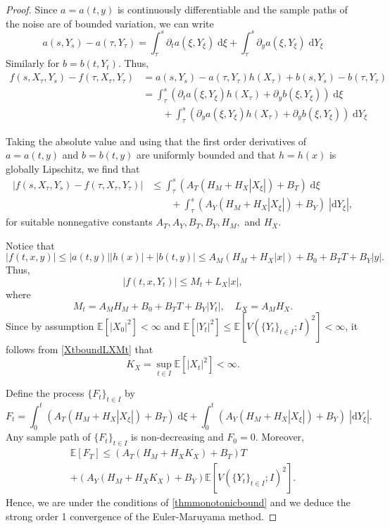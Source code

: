 \documentclass[reqno,12pt]{amsart}
\theoremstyle{plain}%
\theoremstyle{definition}
\begin{document}
\begin{proof}
    Since $a=a(t, y)$ is continuously differentiable and the sample paths of the noise are of bounded variation, we can write
    \[ a(s, Y_s) - a(\tau, Y_\tau) = \int_\tau^s \partial_t a(\xi, Y_\xi) \;\mathrm{d}\xi + \int_\tau^s \partial_y a(\xi, Y_\xi)\;\mathrm{d}Y_\xi
    \]
    Similarly for $b=b(t, Y_t)$. Thus,
    \begin{align*}
        f(s, X_\tau, Y_s) - f(\tau, X_\tau, Y_\tau) & = a(s, Y_s) - a(\tau, Y_\tau)h(X_\tau) + b(s, Y_s) - b(\tau, Y_\tau) \\
        & = \int_\tau^s \left(\partial_t a(\xi, Y_\xi)h(X_\tau) + \partial_y b(\xi, Y_\xi)\right) \;\mathrm{d}\xi \\
        & \qquad + \int_\tau^s \left(\partial_y a(\xi, Y_\xi) h(X_\tau) + \partial_y b(\xi, Y_\xi)\right)\;\mathrm{d}Y_\xi
    \end{align*}

    Taking the absolute value and using that the first order derivatives of $a=a(t, y)$ and $b=b(t, y)$ are uniformly bounded and that $h=h(x)$ is globally Lipschitz, we find that
    \begin{align*}
        |f(s, X_\tau, Y_s) - f(\tau, X_\tau, Y_\tau)| & \leq \int_\tau^s \left(A_T(H_M + H_X|X_\xi|) + B_T\right) \;\mathrm{d}\xi \\
        & \qquad + \int_\tau^s \left(A_Y (H_M + H_X|X_\xi|) + B_Y\right)\;|\mathrm{d}Y_\xi|,
    \end{align*}
    for suitable nonnegative constants $A_T, A_Y, B_T, B_Y, H_M,$ and $H_X$.

    Notice that
    \[
        |f(t, x, y)| \leq |a(t, y)||h(x)| + |b(t, y)| \leq A_M(H_M + H_X|x|) + B_0 + B_T T + B_Y |y|.
    \]
    Thus,
    \[
        |f(t, x, Y_t)| \leq M_t + L_X|x|,
    \]
    where
    \[
        M_t = A_MH_M + B_0 + B_T T + B_Y|Y_t|, \quad L_X = A_MH_X.
    \]
    Since by assumption $\mathbb{E}[|X_0|^2] < \infty$ and $\mathbb{E}[|Y_t|^2] \leq \mathbb{E}[V(\{Y_t\}_{t\in I}; I)^2] < \infty$, it follows from \eqref{XtboundLXMt} that
    \[
        K_X = \sup_{t\in I}\mathbb{E}[|X_t|^2] < \infty.
    \]

    Define the process $\{F_t\}_{t\in I}$ by
    \[
        F_t = \int_0^t \left(A_T(H_M + H_X|X_\xi|) + B_T\right) \;\mathrm{d}\xi + \int_0^t \left(A_Y (H_M + H_X|X_\xi|) + B_Y\right)\;|\mathrm{d}Y_\xi|.
    \]
    Any sample path of $\{F_t\}_{t\in I}$ is non-decreasing and $F_0 = 0$. Moreover,
    \begin{multline*}
        \mathbb{E}[F_T] \leq \left(A_T(H_M + H_XK_X) + B_T\right)T \\
        + \left(A_Y (H_M + H_XK_X) + B_Y\right)\mathbb{E}[V(\{Y_t\}_{t\in I}; I)^2].
    \end{multline*}
    Hence, we are under the conditions of \cref{thmmonotonicbound} and we deduce the strong order 1 convergence of the Euler-Maruyama method.
\end{proof}
\end{document}
